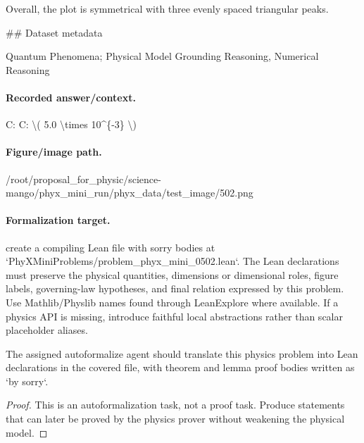 Overall, the plot is symmetrical with three evenly spaced triangular peaks.

\#\# Dataset metadata

Quantum Phenomena; Physical Model Grounding Reasoning, Numerical Reasoning

\paragraph{Recorded answer/context.}
C: C: \textbackslash{}( 5.0 \textbackslash{}times 10\textasciicircum{}\{-3\} \textbackslash{})

\paragraph{Figure/image path.}
/root/proposal\_for\_physic/science-mango/phyx\_mini\_run/phyx\_data/test\_image/502.png

\paragraph{Formalization target.}
create a compiling Lean file with sorry bodies at `PhyXMiniProblems/problem\_phyx\_mini\_0502.lean`. The Lean declarations must preserve the physical quantities, dimensions or dimensional roles, figure labels, governing-law hypotheses, and final relation expressed by this problem.
Use Mathlib/Physlib names found through LeanExplore where available. If a physics API is missing, introduce faithful local abstractions rather than scalar placeholder aliases.

\begin{theorem}
\label{thm:physics:phyx_mini_0502:target}
The assigned autoformalize agent should translate this physics problem into Lean declarations in the covered file, with theorem and lemma proof bodies written as `by sorry`.
\end{theorem}
\begin{proof}
This is an autoformalization task, not a proof task. Produce statements that can later be proved by the physics prover without weakening the physical model.
\end{proof}

